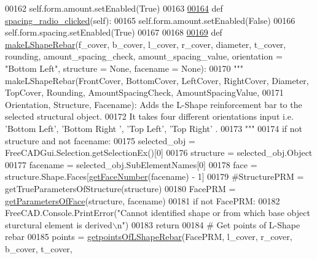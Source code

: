 \begin{DoxyCode}
00162         self.form.amount.setEnabled(\textcolor{keyword}{True})
00163 
\hypertarget{LShapeRebar_8py_source.tex_l00164}{}\hyperlink{classLShapeRebar_1_1__LShapeRebarTaskPanel_a96a085e4b791b00a372b66ea558c440e}{00164}     \textcolor{keyword}{def }\hyperlink{classLShapeRebar_1_1__LShapeRebarTaskPanel_a96a085e4b791b00a372b66ea558c440e}{spacing\_radio\_clicked}(self):
00165         self.form.amount.setEnabled(\textcolor{keyword}{False})
00166         self.form.spacing.setEnabled(\textcolor{keyword}{True})
00167 
00168 
\hypertarget{LShapeRebar_8py_source.tex_l00169}{}\hyperlink{namespaceLShapeRebar_a647a28e94933108c6617da8532d76998}{00169} \textcolor{keyword}{def }\hyperlink{namespaceLShapeRebar_a647a28e94933108c6617da8532d76998}{makeLShapeRebar}(f\_cover, b\_cover, l\_cover, r\_cover, diameter, t\_cover, rounding, 
      amount\_spacing\_check, amount\_spacing\_value, orientation = "Bottom Left", structure = None, facename = None):
00170     \textcolor{stringliteral}{""" makeLShapeRebar(FrontCover, BottomCover, LeftCover, RightCover, Diameter, TopCover, Rounding,
       AmountSpacingCheck, AmountSpacingValue,}
00171 \textcolor{stringliteral}{    Orientation, Structure, Facename): Adds the L-Shape reinforcement bar to the selected structural
       object.}
00172 \textcolor{stringliteral}{    It takes four different orientations input i.e. 'Bottom Left', 'Bottom Right ', 'Top Left', 'Top Right'
      .}
00173 \textcolor{stringliteral}{    """}
00174     \textcolor{keywordflow}{if} \textcolor{keywordflow}{not} structure \textcolor{keywordflow}{and} \textcolor{keywordflow}{not} facename:
00175         selected\_obj = FreeCADGui.Selection.getSelectionEx()[0]
00176         structure = selected\_obj.Object
00177         facename = selected\_obj.SubElementNames[0]
00178     face = structure.Shape.Faces[\hyperlink{namespaceRebarfunc_a3885b3b63e3a41508ac79bc7550cf301}{getFaceNumber}(facename) - 1]
00179     \textcolor{comment}{#StructurePRM = getTrueParametersOfStructure(structure)}
00180     FacePRM = \hyperlink{namespaceRebarfunc_a92122b3d7cedd3d47bb63380a5ac4d08}{getParametersOfFace}(structure, facename)
00181     \textcolor{keywordflow}{if} \textcolor{keywordflow}{not} FacePRM:
00182         FreeCAD.Console.PrintError(\textcolor{stringliteral}{"Cannot identified shape or from which base object sturctural element is
       derived\(\backslash\)n"})
00183         \textcolor{keywordflow}{return}
00184     \textcolor{comment}{# Get points of L-Shape rebar}
00185     points = \hyperlink{namespaceLShapeRebar_a3019960c6f6476cb70df9ee06f330dfb}{getpointsOfLShapeRebar}(FacePRM, l\_cover, r\_cover, b\_cover, t\_cover, 

\end{DoxyCode}
